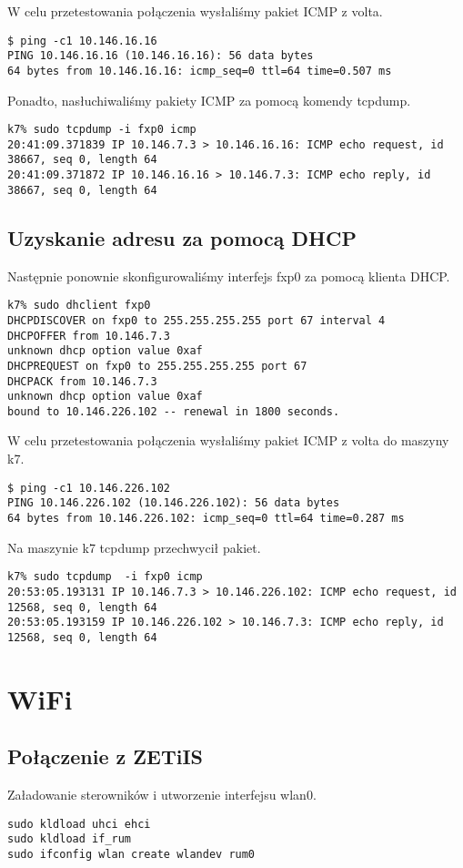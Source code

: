 \documentclass[a4paper,11pt,notitlepage]{article}
\begin{document}
W celu przetestowania połączenia wysłaliśmy pakiet ICMP z volta.
\begin{verbatim}
$ ping -c1 10.146.16.16
PING 10.146.16.16 (10.146.16.16): 56 data bytes
64 bytes from 10.146.16.16: icmp_seq=0 ttl=64 time=0.507 ms
\end{verbatim}

Ponadto, nasłuchiwaliśmy pakiety ICMP za pomocą komendy tcpdump.
\begin{verbatim}
k7% sudo tcpdump -i fxp0 icmp
20:41:09.371839 IP 10.146.7.3 > 10.146.16.16: ICMP echo request, id 38667, seq 0, length 64
20:41:09.371872 IP 10.146.16.16 > 10.146.7.3: ICMP echo reply, id 38667, seq 0, length 64
\end{verbatim}
\subsection{Uzyskanie adresu za pomocą DHCP}
Następnie ponownie skonfigurowaliśmy interfejs fxp0 za pomocą klienta DHCP.
\begin{verbatim}
k7% sudo dhclient fxp0
DHCPDISCOVER on fxp0 to 255.255.255.255 port 67 interval 4
DHCPOFFER from 10.146.7.3
unknown dhcp option value 0xaf
DHCPREQUEST on fxp0 to 255.255.255.255 port 67
DHCPACK from 10.146.7.3
unknown dhcp option value 0xaf
bound to 10.146.226.102 -- renewal in 1800 seconds.
\end{verbatim}
W celu przetestowania połączenia wysłaliśmy pakiet ICMP z volta do maszyny k7.
\begin{verbatim}
$ ping -c1 10.146.226.102
PING 10.146.226.102 (10.146.226.102): 56 data bytes
64 bytes from 10.146.226.102: icmp_seq=0 ttl=64 time=0.287 ms
\end{verbatim}
Na maszynie k7 tcpdump przechwycił pakiet.
\begin{verbatim}
k7% sudo tcpdump  -i fxp0 icmp
20:53:05.193131 IP 10.146.7.3 > 10.146.226.102: ICMP echo request, id 12568, seq 0, length 64
20:53:05.193159 IP 10.146.226.102 > 10.146.7.3: ICMP echo reply, id 12568, seq 0, length 64
\end{verbatim}
\section{WiFi}
\subsection{Połączenie z ZETiIS}
Załadowanie sterowników i utworzenie interfejsu wlan0.
\begin{verbatim}
sudo kldload uhci ehci
sudo kldload if_rum
sudo ifconfig wlan create wlandev rum0
\end{verbatim}
\end{document}
